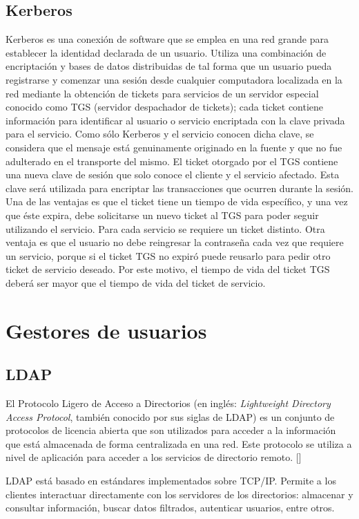 \subsection{Kerberos}
Kerberos es una conexión de software que se emplea en una red grande para establecer la identidad declarada de un usuario. Utiliza una combinación de encriptación y bases de datos distribuidas de tal forma que un usuario pueda registrarse y comenzar una sesión desde cualquier computadora localizada en la red mediante la obtención de tickets para servicios de un servidor especial conocido como TGS (servidor despachador de tickets); cada ticket contiene información para identificar al usuario o servicio encriptada con la clave privada para el servicio. Como sólo Kerberos y el servicio conocen dicha clave, se considera que el mensaje está genuinamente originado en la fuente y que no fue adulterado en el transporte del mismo. El ticket otorgado por el TGS contiene una nueva clave de sesión que solo conoce el cliente y el servicio afectado. Esta clave será utilizada para encriptar las transacciones que ocurren durante la sesión.
Una de las ventajas es que el ticket tiene un tiempo de vida específico, y una vez que éste expira, debe solicitarse un nuevo ticket al TGS para poder seguir utilizando el servicio. Para cada servicio se requiere un ticket distinto. Otra ventaja es que el usuario no debe reingresar la contraseña cada vez que requiere un servicio, porque si el ticket TGS no expiró puede reusarlo para pedir otro ticket de servicio deseado. Por este motivo, el tiempo de vida del ticket TGS deberá ser mayor que el tiempo de vida del ticket de servicio.

\section{Gestores de usuarios} \label{directories}

\subsection{LDAP}
El Protocolo Ligero de Acceso a Directorios (en inglés: \textit{Lightweight Directory Access Protocol}, también conocido por sus siglas de LDAP) es un conjunto de protocolos de licencia abierta que son utilizados para acceder a la información que está almacenada de forma centralizada en una red. Este protocolo se utiliza a nivel de aplicación para acceder a los servicios de directorio remoto. [\cite{ldap-doc}]

LDAP está basado en estándares implementados sobre TCP/IP. Permite a los clientes interactuar directamente con los servidores de los directorios: almacenar y consultar información, buscar datos filtrados, autenticar usuarios, entre otros.

